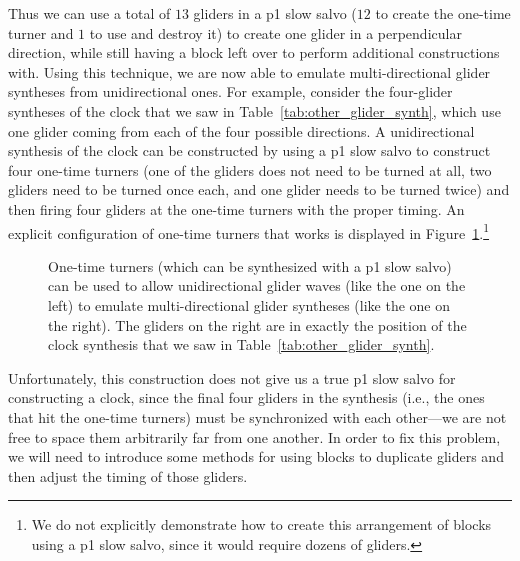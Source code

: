 Thus we can use a total of $13$ gliders in a p1 slow salvo ($12$ to create the one-time turner and $1$ to use and destroy it) to create one glider in a perpendicular direction, while still having a block left over to perform additional constructions with. Using this technique, we are now able to emulate multi-directional glider syntheses from unidirectional ones. For example, consider the four-glider syntheses of the clock that we saw in Table~\ref{tab:other_glider_synth}, which use one glider coming from each of the four possible directions. A unidirectional synthesis of the clock can be constructed by using a p1 slow salvo to construct four one-time turners (one of the gliders does not need to be turned at all, two gliders need to be turned once each, and one glider needs to be turned twice) and then firing four gliders at the one-time turners with the proper timing. An explicit configuration of one-time turners that works is displayed in Figure~\ref{fig:unidirection_clock_synthesis}.\footnote{We do not explicitly demonstrate how to create this arrangement of blocks using a p1 slow salvo, since it would require dozens of gliders.}

\begin{figure}[!ht]
	\centering{}
	\caption{One-time turners (which can be synthesized with a p1 slow salvo) can be used to allow unidirectional glider waves (like the one on the left) to emulate multi-directional glider syntheses (like the one on the right). The gliders on the right are in exactly the position of the clock synthesis that we saw in Table~\ref{tab:other_glider_synth}.}\label{fig:unidirection_clock_synthesis}
\end{figure}

Unfortunately, this construction does not give us a true p1 slow salvo for constructing a clock, since the final four gliders in the synthesis (i.e., the ones that hit the one-time turners) must be synchronized with each other---we are not free to space them arbitrarily far from one another. In order to fix this problem, we will need to introduce some methods for using blocks to duplicate gliders and then adjust the timing of those gliders.


